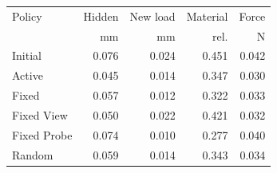 \begin{tabular}{lrrrr}\toprule
Policy & Hidden & New load & Material & Force\\
 & mm & mm & rel. & N\\\midrule
Initial & 0.076 & 0.024 & 0.451 & 0.042\\
Active & 0.045 & 0.014 & 0.347 & 0.030\\
Fixed & 0.057 & 0.012 & 0.322 & 0.033\\
Fixed View & 0.050 & 0.022 & 0.421 & 0.032\\
Fixed Probe & 0.074 & 0.010 & 0.277 & 0.040\\
Random & 0.059 & 0.014 & 0.343 & 0.034\\
\bottomrule\end{tabular}